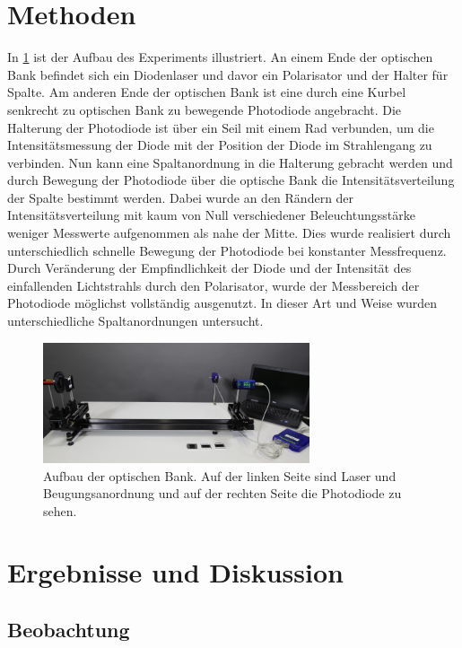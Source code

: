 \documentclass[
	a4paper,
	12pt,
	pagesize,
	ngerman
]{scrartcl}
\begin{document}
	\section{Methoden}
	In \cref{optischeBank} ist der Aufbau des Experiments illustriert.
	An einem Ende der optischen Bank befindet sich ein Diodenlaser und davor ein Polarisator und der Halter für Spalte.
	Am anderen Ende der optischen Bank ist eine durch eine Kurbel senkrecht zu optischen Bank zu bewegende Photodiode angebracht.
	Die Halterung der Photodiode ist über ein Seil mit einem Rad verbunden, um die Intensitätsmessung der Diode mit der Position der Diode im Strahlengang zu verbinden.
	Nun kann eine Spaltanordnung in die Halterung gebracht werden und durch Bewegung der Photodiode über die optische Bank die Intensitätsverteilung der Spalte bestimmt werden.
	Dabei wurde an den Rändern der Intensitätsverteilung mit kaum von Null verschiedener Beleuchtungsstärke weniger Messwerte aufgenommen als nahe der Mitte.
	Dies wurde realisiert durch unterschiedlich schnelle Bewegung der Photodiode bei konstanter Messfrequenz.
	Durch Veränderung der Empfindlichkeit der Diode und der Intensität des einfallenden Lichtstrahls durch den Polarisator, wurde der Messbereich der Photodiode möglichst vollständig ausgenutzt.
	In dieser Art und Weise wurden unterschiedliche Spaltanordnungen untersucht. 
	
	\begin{figure}[H]
		\includegraphics[width=0.7\textwidth]{optischeBank}
		\centering
		\caption{Aufbau der optischen Bank. Auf der linken Seite sind Laser und Beugungsanordnung und auf der rechten Seite die Photodiode zu sehen.\cite{optischeBank} }
		\label{optischeBank}
		\centering
	\end{figure} 
	
	\section{Ergebnisse und Diskussion}
	

	\subsection{Beobachtung}
	
\end{document}
